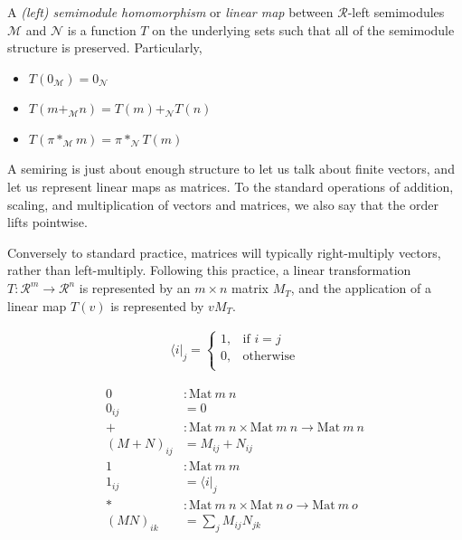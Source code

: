 \documentclass[acmsmall,review]{acmart}
\begin{document}
\begin{definition}
  A \emph{(left) semimodule homomorphism} or \emph{linear map} between
  $\mathscr R$-left semimodules $\mathscr M$ and $\mathscr N$ is a function $T$
  on the underlying sets such that all of the semimodule structure is preserved.
  Particularly,
  \begin{itemize}
  \item $T(0_\mathscr M) = 0_\mathscr N$
  \item $T(m +_\mathscr M n) = T(m) +_\mathscr N T(n)$
  \item $T(\pi *_\mathscr M m) = \pi *_\mathscr N T(m)$
  \end{itemize}
\end{definition}

A semiring is just about enough structure to let us talk about finite vectors,
and let us represent linear maps as matrices.
To the standard operations of addition, scaling, and multiplication of vectors
and matrices, we also say that the order lifts pointwise.

Conversely to standard practice, matrices will typically right-multiply vectors,
rather than left-multiply.
Following this practice, a linear transformation
$T : \mathscr R^m \to \mathscr R^n$ is represented by an $m \times n$ matrix
$M_T$, and the application of a linear map $T(v)$ is represented by $vM_T$.

\begin{definition}
  \begin{align*}
    \langle i \rvert_j =
    \begin{cases}
      1, & \textrm{if }i = j \\
      0, & \textrm{otherwise} \\
    \end{cases}
  \end{align*}
\end{definition}

\begin{definition}
    \begin{align*}
      0 &: \mathrm{Mat}~m~n \\
      0_{ij} &= 0 \\
      + &: \mathrm{Mat}~m~n \times \mathrm{Mat}~m~n \to \mathrm{Mat}~m~n \\
      (M + N)_{ij} &= M_{ij} + N_{ij} \\
      1 &: \mathrm{Mat}~m~m \\
      1_{ij} &= \langle i \rvert_j \\
      * &: \mathrm{Mat}~m~n \times \mathrm{Mat}~n~o \to \mathrm{Mat}~m~o \\
      (MN)_{ik} &= \sum_j M_{ij}N_{jk}
    \end{align*}
\end{definition}
\end{document}
